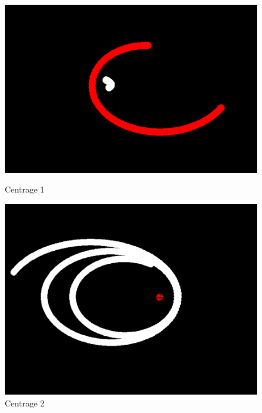 \documentclass[a4paper, 12pt]{article}
\begin{document}
	\begin{figure}[H]
    	\centering
    	\begin{minipage}{0.27\linewidth}
        	\centering
        	\includegraphics[width=\linewidth]{img/centrage1.png}
        	\caption{\label{fig:centrage1} Centrage 1}
    	\end{minipage}
    	\hspace{0.05\linewidth}  %
    	\begin{minipage}{0.27\linewidth}
        	\centering
        	\includegraphics[width=\linewidth]{img/centrage2.png}
        	\caption{\label{fig:centrage2} Centrage 2} 
    	\end{minipage}
	\end{figure} 
\end{document}
